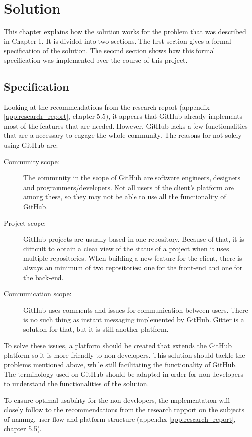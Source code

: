 \chapter{Solution}

This chapter explains how the solution works for the problem that was described in Chapter 1. It is divided into two sections. The first section gives a formal specification of the solution. The second section shows how this formal specification was implemented over the course of this project.

\section{Specification}
Looking at the recommendations from the research report (appendix \ref{app:research_report}, chapter 5.5), it appears that GitHub already implements most of the features that are needed. However, GitHub lacks a few functionalities that are a necessary to engage the whole community. The reasons for not solely using GitHub are:
\begin{description}
    \item [Community scope:]
            The community in the scope of GitHub are software engineers, designers and programmers/developers. Not all users of the client's platform are among these, so they may not be able to use all the functionality of GitHub. 
    \item [Project scope:]
            GitHub projects are usually based in one repository. Because of that, it is difficult to obtain a clear view of the status of a project when it uses multiple repositories. When building a new feature for the client, there is always an minimum of two repositories: one for the front-end and one for the back-end.
    \item [Communication scope:]
            GitHub uses comments and issues for communication between users. There is no such thing as instant messaging implemented by GitHub. Gitter is a solution for that, but it is still another platform.
\end{description}
To solve these issues, a platform should be created that extends the GitHub platform so it is more friendly to non-developers. This solution should tackle the problems mentioned above, while still facilitating the functionality of GitHub. The terminology used on GitHub should be adapted in order for non-developers to understand the functionalities of the solution. 

To ensure optimal usability for the non-developers, the implementation will closely follow to the recommendations from the research rapport on the subjects of naming, user-flow and platform structure (appendix \ref{app:research_report}, chapter 5.5).

